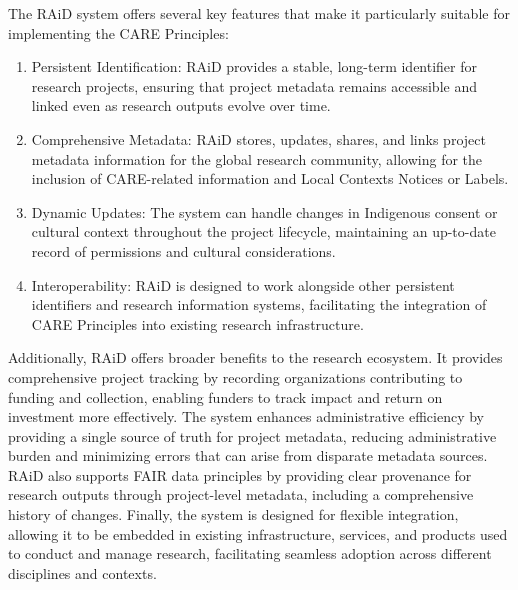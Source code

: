 \documentclass[a0,portrait]{a0poster}
\begin{document}
\begin{multicols}{2}
{The RAiD system offers several key features that make it particularly suitable for implementing the CARE Principles:

\begin{enumerate}
\item Persistent Identification: RAiD provides a stable, long-term identifier for research projects, ensuring that project metadata remains accessible and linked even as research outputs evolve over time.
\item Comprehensive Metadata: RAiD stores, updates, shares, and links project metadata information for the global research community, allowing for the inclusion of CARE-related information and Local Contexts Notices or Labels.
\item Dynamic Updates: The system can handle changes in Indigenous consent or cultural context throughout the project lifecycle, maintaining an up-to-date record of permissions and cultural considerations.
\item Interoperability: RAiD is designed to work alongside other persistent identifiers and research information systems, facilitating the integration of CARE Principles into existing research infrastructure.
\end{enumerate}

Additionally, RAiD offers broader benefits to the research ecosystem. It provides comprehensive project tracking by recording organizations contributing to funding and collection, enabling funders to track impact and return on investment more effectively. The system enhances administrative efficiency by providing a single source of truth for project metadata, reducing administrative burden and minimizing errors that can arise from disparate metadata sources. RAiD also supports FAIR data principles by providing clear provenance for research outputs through project-level metadata, including a comprehensive history of changes. Finally, the system is designed for flexible integration, allowing it to be embedded in existing infrastructure, services, and products used to conduct and manage research, facilitating seamless adoption across different disciplines and contexts.

}


\end{multicols}
\end{document}
